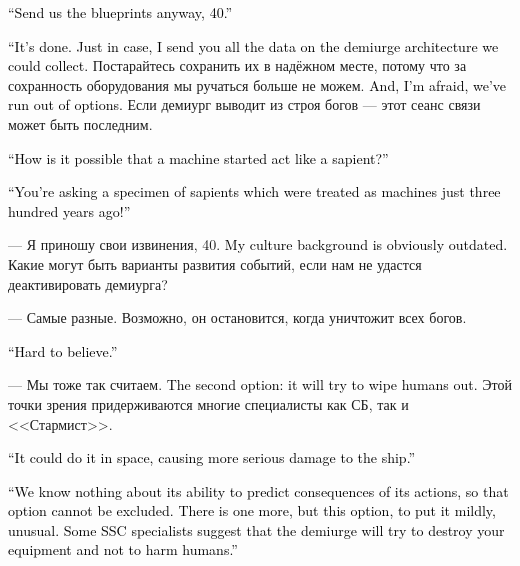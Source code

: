 \documentclass[a4paper,10pt,fleqn]{book}\usepackage{polyglossia}\setdefaultlanguage{english}\setotherlanguage{russian}\defaultfontfeatures{Ligatures=TeX,Mapping=tex-text}\usepackage{xcolor}\definecolor{lightgray}{HTML}{bbbbbb}\color{lightgray}\newcommand{\ml}[3]{\textcolor{black}{#3}}
\begin{document}
\ml{$0$}
{--- Всё равно пришлите нам схемы, 40.}
{``Send us the blueprints anyway, 40.''}

\ml{$0$}
{--- Сделано.}
{``It's done.}
\ml{$0$}
{На всякий случай я дополнительно переслал вам все данные по архитектуре демиурга, которые нам удалось собрать.}
{Just in case, I send you all the data on the demiurge architecture we could collect.}
Постарайтесь сохранить их в надёжном месте, потому что за сохранность оборудования мы ручаться больше не можем.
\ml{$0$}
{Больше, увы, сделать ничего нельзя.}
{And, I'm afraid, we've run out of options.}
Если демиург выводит из строя богов --- этот сеанс связи может быть последним.

\ml{$0$}
{--- Как вообще могло получиться, что машина начала вести себя как разумное существо?}
{``How is it possible that a machine started act like a sapient?''}

\ml{$0$}
{--- Вы спрашиваете у существа, которое ещё триста лет назад считали машиной!}
{``You're asking a specimen of sapients which were treated as machines just three hundred years ago!''}

--- Я приношу свои извинения, 40.
\ml{$0$}
{Мой культурный код явно устарел.}
{My culture background is obviously outdated.}
Какие могут быть варианты развития событий, если нам не удастся деактивировать демиурга?

--- Самые разные.
Возможно, он остановится, когда уничтожит всех богов.

\ml{$0$}
{--- Это сомнительно.}
{``Hard to believe.''}

--- Мы тоже так считаем.
\ml{$0$}
{Второй вариант --- он попытается уничтожить людей.}
{The second option: it will try to wipe humans out.}
Этой точки зрения придерживаются многие специалисты как СБ, так и <<Стармист>>.

\ml{$0$}
{--- Он мог уничтожить нас ещё в космосе, нанеся кораблю более значимые повреждения.}
{``It could do it in space, causing more serious damage to the ship.''}

\ml{$0$}
{--- Мы не знаем о том, насколько он способен предсказывать последствия своих действий, поэтому этот вариант исключать нельзя.}
{``We know nothing about its ability to predict consequences of its actions, so that option cannot be excluded.}
\ml{$0$}
{Есть ещё третий вариант, но он, мягко говоря, необычный.}
{There is one more, but this option, to put it mildly, unusual.}
\ml{$0$}
{Некоторые специалисты СБ предполагают, что демиург попытается уничтожить вашу технику, стараясь не причинить вреда людям.}
{Some SSC specialists suggest that the demiurge will try to destroy your equipment and not to harm humans.''}
\end{document}
